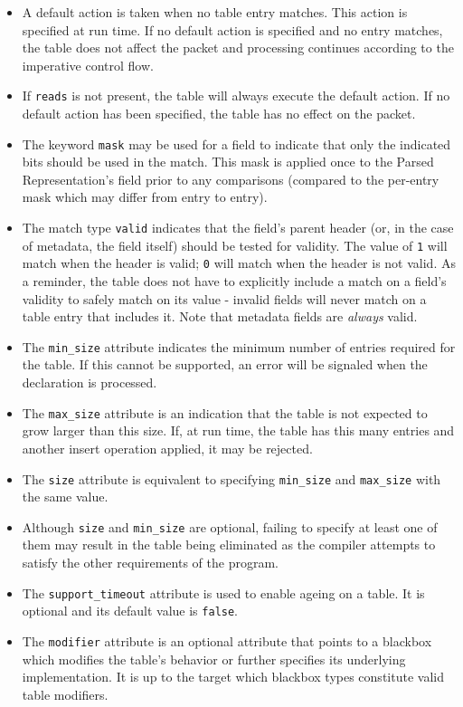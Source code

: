\documentclass[12pt]{article}
\begin{document}
\begin{itemize}
\item
A default action is taken when no table entry matches.  This action is specified 
at run time. If no default action is specified and no entry matches, the table 
does not affect the packet and processing continues according to the imperative 
control flow.
\item
If \texttt{reads} is not present, the table will always execute the default action. 
If no default action has been specified, the table has no effect on the packet.
\item
The keyword \texttt{mask} may be used for a field to indicate that only the indicated 
bits should be used in the match. This mask is applied once to the Parsed 
Representation's field prior to any comparisons (compared to the per-entry 
mask which may differ from entry to entry).
\item
The match type \texttt{valid} indicates that the field's parent header (or, in the 
case of metadata, the field itself) should be tested for validity.  The value 
of \texttt{1} will match when the header is valid; \texttt{0} will match when the header is 
not valid. As a reminder, the table does not have to explicitly include a 
match on a field's validity to safely match on its value - invalid fields 
will never match on a table entry that includes it. Note that metadata fields 
are \textit{always} valid.
\item
The \texttt{min_size} attribute indicates the minimum number of entries required 
for the table. If this cannot be supported, an error will be signaled when 
the declaration is processed.
\item
The \texttt{max_size} attribute is an indication that the table is not expected to 
grow larger than this size. If, at run time, the table has this many entries 
and another insert operation applied, it may be rejected.
\item
The \texttt{size} attribute is equivalent to specifying \texttt{min_size} and \texttt{max_size} with 
the same value.
\item
Although \texttt{size} and \texttt{min_size} are optional, failing to specify at least one 
of them may result in the table being eliminated as the compiler attempts 
to satisfy the other requirements of the program.
\item
The \texttt{support_timeout} attribute is used to enable ageing on a table. It
is optional and its default value is \texttt{false}.
\item
The \texttt{modifier} attribute is an optional attribute that points to a
blackbox which modifies the table's behavior or further specifies its
underlying implementation. It is up to the target which blackbox types
constitute valid table modifiers.
\end{itemize}
\end{document}
